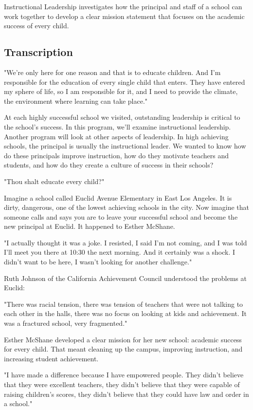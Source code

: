 Instructional Leadership investigates how the principal and staff of a school can work together to develop a clear mission statement that focuses on the academic success of every child.

\subsection{Transcription}

"We're only here for one reason and that is to educate children. And I'm responsible for the education of every single child that enters. They have entered my sphere of life, so I am responsible for it, and I need to provide the climate, the environment where learning can take place."

At each highly successful school we visited, outstanding leadership is critical to the school's success. In this program, we'll examine instructional leadership. Another program will look at other aspects of leadership. In high achieving schools, the principal is usually the instructional leader. We wanted to know how do these principals improve instruction, how do they motivate teachers and students, and how do they create a culture of success in their schools?

"Thou shalt educate every child?"

Imagine a school called Euclid Avenue Elementary in East Los Angeles. It is dirty, dangerous, one of the lowest achieving schools in the city. Now imagine that someone calls and says you are to leave your successful school and become the new principal at Euclid. It happened to Esther McShane.

"I actually thought it was a joke. I resisted, I said I'm not coming, and I was told I'll meet you there at 10:30 the next morning. And it certainly was a shock. I didn't want to be here, I wasn't looking for another challenge."

Ruth Johnson of the California Achievement Council understood the problems at Euclid:

"There was racial tension, there was tension of teachers that were not talking to each other in the halls, there was no focus on looking at kids and achievement. It was a fractured school, very fragmented."

Esther McShane developed a clear mission for her new school: academic success for every child. That meant cleaning up the campus, improving instruction, and increasing student achievement.

"I have made a difference because I have empowered people. They didn't believe that they were excellent teachers, they didn't believe that they were capable of raising children's scores, they didn't believe that they could have law and order in a school."

